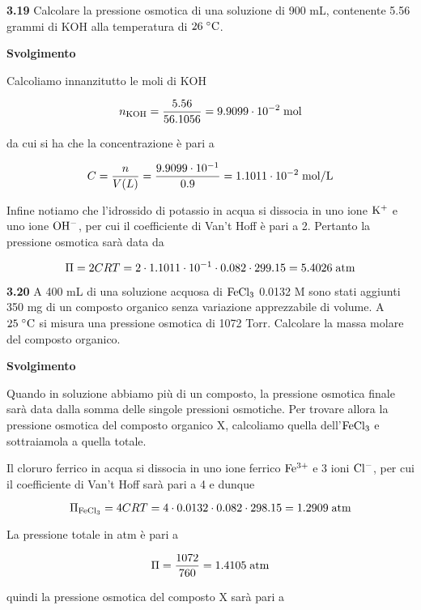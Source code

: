 \vspace{0.2cm}\textbf{3.19} Calcolare la pressione osmotica di una soluzione di 900 mL, contenente 5.56 grammi di KOH alla temperatura di $26 \; ^{\circ} \rm C$.

\vspace{0.2cm}\large\textbf{Svolgimento}\normalsize

\vspace{0.2cm}Calcoliamo innanzitutto le moli di KOH

$$n_{\rm KOH}=\frac{5.56}{56.1056}
=9.9099 \cdot 10^{-2} \; \rm mol$$

da cui si ha che la concentrazione è pari a

$$C=\frac{n}{V(L)}
=\frac{9.9099 \cdot 10^{-1}}{0.9}
=1.1011 \cdot 10^{-2} \; \rm mol/L$$

Infine notiamo che l'idrossido di potassio in acqua si dissocia in uno ione $\rm K^+$ e uno ione $\rm OH^-$, per cui il coefficiente di Van't Hoff è pari a 2. Pertanto la pressione osmotica sarà data da

$$\Pi=2CRT
=2 \cdot 1.1011 \cdot 10^{-1} \cdot 0.082 \cdot 299.15
=5.4026 \; \rm atm$$

\vspace{0.2cm}\textbf{3.20} A 400 mL di una soluzione acquosa di $\rm FeCl_3$ 0.0132 M sono stati aggiunti 350 mg di un composto organico senza variazione apprezzabile di volume. A $25 \; ^{\circ} \rm C$ si misura una pressione osmotica di 1072 Torr. Calcolare la massa molare del composto organico.

\vspace{0.2cm}\large\textbf{Svolgimento}\normalsize

\vspace{0.2cm}Quando in soluzione abbiamo più di un composto, la pressione osmotica finale sarà data dalla somma delle singole pressioni osmotiche. Per trovare allora la pressione osmotica del composto organico X, calcoliamo quella dell'$\rm FeCl_3$ e sottraiamola a quella totale.

Il cloruro ferrico in acqua si dissocia in uno ione ferrico $\rm Fe^{3+}$ e 3 ioni $\rm Cl^-$, per cui il coefficiente di Van't Hoff sarà pari a 4 e dunque

$$\Pi_{\rm FeCl_3}=4CRT
=4 \cdot 0.0132 \cdot 0.082 \cdot 298.15
=1.2909 \; \rm atm$$

La pressione totale in atm è pari a

$$\Pi=\frac{1072}{760}=1.4105 \; \rm atm$$

quindi la pressione osmotica del composto X sarà pari a

